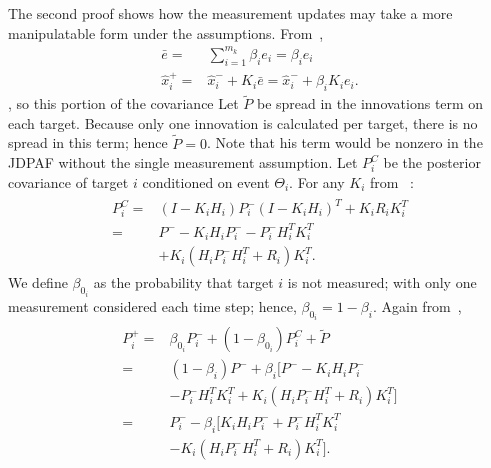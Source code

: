 \documentclass[letterpaper, 10pt, conference]{ieeeconf}
\begin{document}
\begin{appendix}
The second proof shows how the measurement updates may take a more manipulatable form under the assumptions. From~\cite[Section 6.4]{TrackDataAssoc},
\begin{align}
\bar e=&\displaystyle\sum\limits_{i=1}^{m_k}\beta_ie_i=\beta_ie_i\\
\hat x^+_i=&\hat x^-_i+K_i\bar e=\hat x^-_i+\beta_iK_ie_i.
\end{align}
 , so this portion of the covariance Let $\tilde{P}$ be spread in the innovations term on each target. Because only one innovation is calculated per target, there is no spread in this term; hence $\tilde{P}=0$. Note that his term would be nonzero in the JDPAF without the single measurement assumption. Let $P_{i}^C$ be the posterior covariance of target $i$ conditioned on event $\Theta_i$. For any $K_i$ from ~\cite[Section 4.2]{OptEst1}:
\begin{align}
\begin{split}
P_{i}^C=&(I-K_{i}H_{i})P_{i}^{-}(I-K_{i}H_{i})^T+K_{i}R_{i}K_{i}^T\\
=&P^--K_{i}H_{i}P_{i}^{-}-P_{i}^{-}H_{i}^TK_{i}^T\\
&+K_{i}(H_{i}P_{i}^{-}H_{i}^T+R_i)K_{i}^T.
\end{split}
\end{align}
We define $\beta_{0_i}$ as the probability that target $i$ is not measured; with only one measurement considered each time step; hence, $\beta_{0_i}=1-\beta_i$. Again from~\cite[Section 6.4]{TrackDataAssoc},
\begin{align}
\begin{split}
P^+_i=&\beta_{0_i}P^-_i+(1-\beta_{0_i})P_i^C+\tilde{P}\\
=&(1-\beta_i)P^-+\beta_i[P^--K_{i}H_{i}P_{i}^{-}\\
&-P_{i}^{-}H_{i}^TK_{i}^T+K_{i}(H_{i}P_{i}^{-}H_{i}^T+R_i)K_{i}^T]\\
=&P^-_i-\beta_i[K_{i}H_{i}P_{i}^{-}+P_{i}^{-}H_{i}^TK_{i}^T\\
&-K_{i}(H_{i}P_{i}^{-}H_{i}^T+R_i)K_{i}^T].
\end{split}
\end{align}



\end{appendix}



\end{document}
